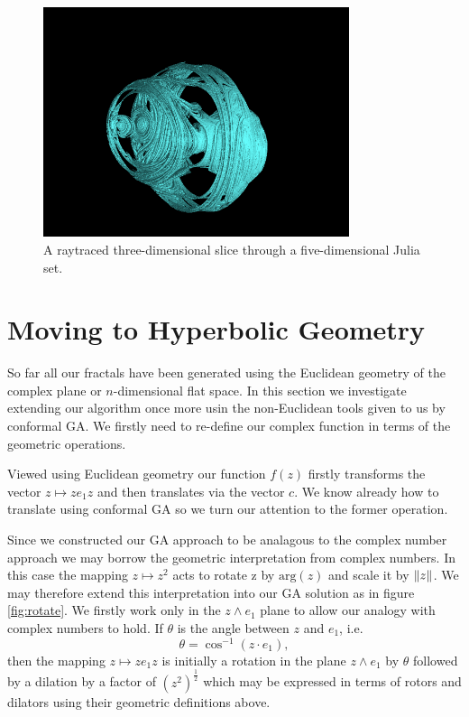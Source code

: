\begin{figure}
\centering
\includegraphics[width=0.8\textwidth]{5djulia}
\caption{\label{fig:5djulia}
  A raytraced three-dimensional slice through a five-dimensional Julia set.
}
\end{figure}

\section{Moving to Hyperbolic Geometry}

So far all our fractals have been generated using the Euclidean geometry of the complex plane
or $n$-dimensional flat space. In this section we investigate extending our algorithm once
more usin the non-Euclidean tools given to us by conformal GA. We firstly need to re-define 
our complex function in terms of the geometric operations.

Viewed using Euclidean geometry our function $f(z)$ firstly transforms the vector
$z \mapsto ze_1z$ and then translates via the vector $c$. We know already how to translate
using conformal GA so we turn our attention to the former operation.

Since we constructed our GA approach to be analagous to the complex number approach we
may borrow the geometric interpretation from complex numbers. In this case the mapping 
$z \mapsto z^2$ acts to rotate z by $\mathrm{arg}(z)$ and scale it by
$\left\Vert z \right\Vert$. We may therefore extend this interpretation into our GA solution as in
figure \ref{fig:rotate}. We firstly work only in the $z \wedge e_1$ plane to allow
our analogy with complex numbers to hold. If $\theta$ is the angle between $z$ and
$e_1$, i.e.
\[
\theta = \cos^{-1}(z \cdot e_1),
\] 
then the mapping $z \mapsto ze_1z$ is initially a rotation in the plane $z \wedge e_1$
by $\theta$ followed by a dilation by a factor of $(z^2)^\frac{1}{2}$ 
which may be expressed in terms of rotors and dilators using their geometric
definitions above.

